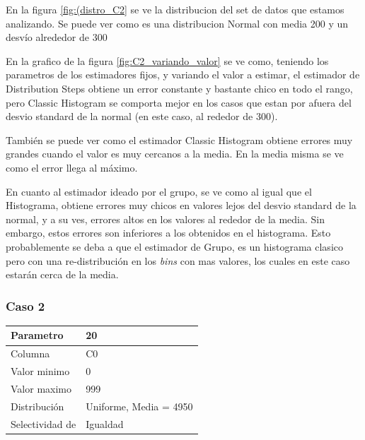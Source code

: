 		En la figura \ref{fig:(distro_C2} se ve la distribucion del set de datos que estamos analizando. Se puede ver como es una distribucion Normal con media 200 y un desv\'io alrededor de 300
		
		En la grafico de la figura \ref{fig:C2_variando_valor} se ve como, teniendo los parametros de los estimadores fijos, y variando el valor a estimar, el estimador de Distribution Steps obtiene un error constante y bastante chico en todo el rango, pero Classic Histogram se comporta mejor en los casos que estan por afuera del desvio standard de la normal (en este caso, al rededor de 300).
		
		Tambi\'en se puede ver como el estimador Classic Histogram obtiene errores muy grandes cuando el valor es muy cercanos a la media. En la media misma se ve como el error llega al m\'aximo.
		
		En cuanto al estimador ideado por el grupo, se ve como al igual que el Histograma, obtiene errores muy chicos en valores lejos del desvio standard de la normal, y a su ves, errores altos en los valores al rededor de la media. Sin embargo, estos errores son inferiores a los obtenidos en el histograma. Esto probablemente se deba a que el estimador de Grupo, es un histograma clasico pero con una re-distribuci\'on en los \textit{bins} con mas valores, los cuales en este caso estarán cerca de la media.
	
		\subsubsection*{Caso 2}
		
		\begin{tabular}{| l | l |}
		\hline
		Parametro & 20 \\
		\hline
		Columna & C0 \\
		\hline
		Valor minimo & 0 \\
		\hline
		Valor maximo & 999 \\
		\hline
		Distribuci\'on & Uniforme, Media = 4950 \\
		\hline
		Selectividad de & Igualdad \\
		\hline
		\end{tabular}		

